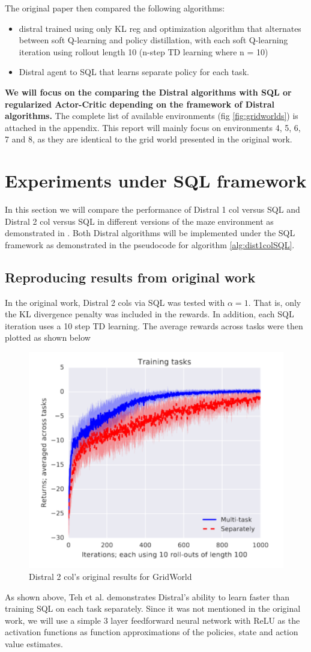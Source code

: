 \documentclass[12pt]{report}
\begin{document}
The original paper then compared the following algorithms:
\begin{itemize}
    \item distral trained using only KL reg and optimization algorithm that alternates between soft Q-learning and policy distillation, with each soft Q-learning iteration using rollout length 10 (n-step TD learning where n = 10)
    \item Distral agent to SQL that learns separate policy for each task.
\end{itemize}
\textbf{We will focus on the comparing the Distral algorithms with SQL or regularized Actor-Critic depending on the framework of Distral algorithms.} The complete list of available environments (fig \ref{fig:gridworlds}) is attached in the appendix. This report will mainly focus on environments 4, 5, 6, 7 and 8, as they are identical to the grid world presented in the original work.

\section{Experiments under SQL framework}
In this section we will compare the performance of Distral 1 col versus SQL and Distral 2 col versus SQL in different versions of the maze environment as demonstrated in  \cite{teh2017distral}. Both Distral algorithms will be implemented under the SQL framework as demonstrated in the pseudocode for algorithm \ref{alg:dist1colSQL}.

\subsection{Reproducing results from original work}

In the original work, Distral 2 cols via SQL was tested with $\alpha = 1$. That is, only the KL divergence penalty was included in the rewards. In addition, each SQL iteration uses a 10 step TD learning. The average rewards across tasks were then plotted as shown below
\begin{figure}[H]
    \center
    \includegraphics[width=0.5\linewidth]{figs/Distral_paper_res.png}
    \caption{Distral 2 col's original results for GridWorld}
\end{figure}
As shown above, Teh et al. \cite{teh2017distral} demonstrates Distral's ability to learn faster than training SQL on each task separately. Since it was not mentioned in the original work, we will use a simple 3 layer feedforward neural network with ReLU as the activation functions as function approximations of the policies, state and action value estimates.\\
\end{document}
